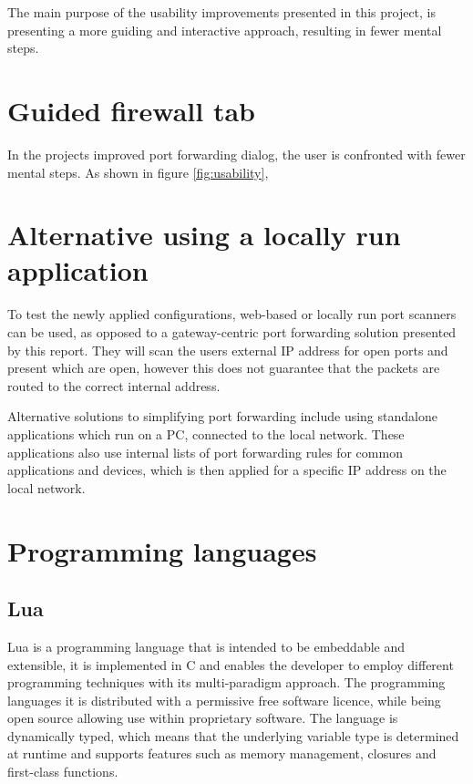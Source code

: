 \documentclass[a4paper,11pt,makeidx]{kth-bcs}
\begin{document}
The main purpose of the usability improvements presented in this project, is presenting a more guiding and interactive approach, resulting in fewer mental steps.

\section{Guided firewall tab}
In the projects improved port forwarding dialog, the user is confronted with fewer mental steps.
As shown in figure \ref{fig:usability}, 

\section{Alternative using a locally run application}
To test the newly applied configurations, web-based or locally run port scanners can be used, as opposed to a gateway-centric port forwarding solution presented by this report.
They will scan the users external IP address for open ports and present which are open, however this does not guarantee that the packets are routed to the correct internal address.

Alternative solutions to simplifying port forwarding include using standalone applications which run on a PC, connected to the local network.
These applications also use internal lists of port forwarding rules for common applications and devices, which is then applied for a specific IP address on the local network.\cite{portforward.com}

\section{Programming languages}
\subsection{Lua}
Lua is a programming language that is intended to be embeddable and extensible, it is implemented in C and enables the developer to employ different programming techniques with its multi-paradigm approach.
The programming languages it is distributed with a permissive free software licence\cite{mit-license}, while being open source allowing use within proprietary software.
The language is dynamically typed, which means that the underlying variable type is determined at runtime and supports features such as memory management, closures and first-class functions.\nocite{ierusalimschy2006programming}
\end{document}
